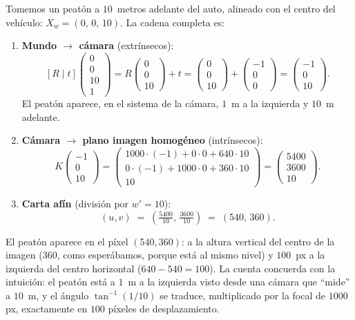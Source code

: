 \documentclass[11pt,a4paper]{article}
\begin{document}
Tomemos un peatón a $10$~metros adelante del auto, alineado con el
centro del vehículo: $X_w = (0,\,0,\,10)$. La cadena completa es:
\begin{enumerate}[leftmargin=1.4em,itemsep=2pt]
\item \textbf{Mundo $\to$ cámara} (extrínsecos):
\[
  [R\mid t]\!
  \begin{pmatrix} 0\\ 0\\ 10\\ 1\end{pmatrix}
  =
  R\!\begin{pmatrix} 0\\0\\10\end{pmatrix} + t
  = \begin{pmatrix} 0\\0\\10\end{pmatrix} + \begin{pmatrix} -1\\0\\0\end{pmatrix}
  = \begin{pmatrix} -1\\ 0\\ 10\end{pmatrix}.
\]
El peatón aparece, en el sistema de la cámara, $1$~m a la izquierda y
$10$~m adelante.
\item \textbf{Cámara $\to$ plano imagen homogéneo} (intrínsecos):
\[
  K\!\begin{pmatrix} -1\\ 0\\ 10\end{pmatrix}
  =
  \begin{pmatrix}
    1000\cdot(-1)+0\cdot 0+640\cdot 10\\
    0\cdot(-1)+1000\cdot 0+360\cdot 10\\
    10
  \end{pmatrix}
  =
  \begin{pmatrix} 5400\\ 3600\\ 10\end{pmatrix}.
\]
\item \textbf{Carta afín} (división por $w'=10$):
\[
  (u,v) \;=\; \left(\tfrac{5400}{10},\,\tfrac{3600}{10}\right)
  \;=\; (540,\,360).
\]
\end{enumerate}
El peatón aparece en el píxel $(540,360)$: a la altura vertical del
centro de la imagen ($360$, como esperábamos, porque está al mismo
nivel) y $100$~px a la izquierda del centro horizontal ($640-540=100$).
La cuenta concuerda con la intuición: el peatón está a $1$~m a la
izquierda visto desde una cámara que ``mide'' a $10$~m, y el ángulo
$\tan^{-1}(1/10)$ se traduce, multiplicado por la focal de $1000$ px,
exactamente en $100$ píxeles de desplazamiento.
\end{document}
